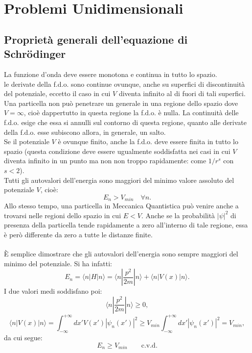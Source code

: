 \chapter{Problemi Unidimensionali}
\section{Proprietà generali dell'equazione di Schr\"{o}dinger}
La funzione d'onda deve essere monotona e continua in tutto lo spazio.\\
le derivate della f.d.o. sono continue ovunque, anche su superfici di discontinuità del potenziale, eccetto il caso in cui $V$ diventa infinito al di fuori di tali superfici.\\
Una particella non può penetrare un generale in una regione dello spazio dove $V =\infty$, cioè dappertutto in questa regione la f.d.o. è nulla. La continuità delle f.d.o. esige che essa si annulli sul contorno di questa regione, quanto alle derivate della f.d.o. esse subiscono allora, in generale, un salto.\\
Se il potenziale $V$ è ovunque finito, anche la f.d.o. deve essere finita in tutto lo spazio (questa condizione deve essere ugualmente soddisfatta nei casi in cui $V$ diventa infinito in un punto ma non non troppo rapidamente: come $1/r^s$ con $s<2$).\\
Tutti gli autovalori dell'energia sono maggiori del minimo valore assoluto del potenziale $V$, cioè:
\begin{equation}
E_n >V_{min} \quad \forall n.
\end{equation}
Allo stesso tempo, una particella in Meccanica Quantistica può venire anche a trovarsi nelle regioni dello spazio in cui $E<V$. Anche se la probabilità $|\psi|^2$ di presenza della particella tende rapidamente a zero all'interno di tale regione, essa è però differente da zero a tutte le distanze finite.\\ \\
È semplice dimostrare che gli autovalori dell'energia sono sempre maggiori del minimo del potenziale. Si ha infatti:
\begin{equation}
E_n = \langle n | H |n \rangle = \langle n | \frac{p^2}{2m} |n \rangle + \langle n | V(x) |n \rangle.
\end{equation}
I due valori medi soddisfano poi:
\begin{equation}
\langle n | \frac{p^2}{2m} |n \rangle \geq 0,
\end{equation}
\begin{equation}
\langle n | V(x) |n \rangle = \int _{-\infty} ^{+\infty} dx' V(x')|\psi _n(x')|^2 \geq V_{min} \int _{-\infty} ^{+\infty} dx' |\psi _n(x')|^2 = V_{min},
\end{equation}
da cui segue:
\begin{equation}
E_n \geq V_{min} \qquad \textrm{c.v.d.}
\end{equation}
